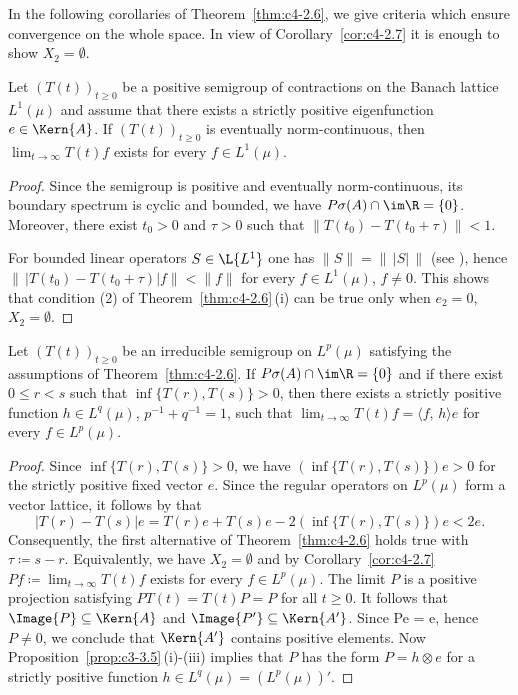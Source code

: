 In the following corollaries of Theorem~\ref{thm:c4-2.6}, we give criteria which ensure convergence on the whole space.
In view of Corollary~\ref{cor:c4-2.7} it is enough to show $X_{2} = \emptyset$.
\begin{corollary}\label{cor:c4-2.9}
%
Let $(T(t))_{t \geq 0}$ be a positive semigroup of contractions on the Banach lattice $L^{1}(\mu)$ and assume that there exists a strictly positive eigenfunction $e \in \Kern{A}$.
If\/ $(T(t))_{t \geq 0}$ is eventually norm-continuous, then $\lim_{t \to \infty}T(t)f$ exists for every $f \in L^{1}(\mu)$.
\end{corollary}
\begin{proof}
Since the semigroup is positive and eventually norm-continuous, its boundary spectrum is cyclic and bounded, \ie  we have $P{\sigma}(A) \cap \im\R = \{0\}$.
Moreover, there exist $t_{0} > 0$ and $\tau > 0$ such that $\|T(t_{0}) - T(t_{0}+\tau)\| < 1$.

For bounded linear operators $S \in \L{L^{1}}$ 
one has $\|S\| = \|\,|S|\,\|$ (see \textcite[IV, Theorem 1.5]{schaefer:1974}), hence $\|\,|T(t_{0}) - T(t_{0}+\tau)| f\| < \|f\|$ for every $f \in L^{1}(\mu)$, $f \neq 0$.
This shows that condition (2) of Theorem~\ref{thm:c4-2.6}\,(i) can be true only when $e_{2} = 0$, \ie  $X_{2} = \emptyset$.
\end{proof}
\begin{corollary}\label{cor:c4-2.10}
%
%
Let $(T(t))_{t\geq 0}$ be an irreducible semigroup on $L^{p}(\mu)$ satisfying the assumptions of Theorem~\ref{thm:c4-2.6}.
If\/ $P{\sigma}(A) \cap \im\R = \{0\}$ and if there exist $0 \leq r < s$ such that $\inf\{T(r),T(s)\} > 0$, then there exists a strictly positive function $h \in L^{q}(\mu)$, $p^{-1}+q^{-1} = 1$, such that $\lim_{t \to \infty} T(t)f = \langle f,\,h \rangle e$ for every $f \in L^{p}(\mu)$.
\end{corollary}
\begin{proof}
Since $\inf\{T(r),T(s)\} > 0$, we have $(\inf\{T(r),T(s)\})e > 0$ for the strictly positive fixed vector $e$.
Since the regular operators on $L^{p}(\mu)$ form a vector lattice, it follows by \textcite[II.1.4, Formula (5) \& (5')]{schaefer:1974} that 
\[
|T(r) - T(s)|e = T(r)e + T(s)e - 2(\inf\{T(r),T(s)\})e < 2e .
\]
Consequently, the first alternative of Theorem~\ref{thm:c4-2.6} holds true with $\tau \coloneq s-r$.
Equivalently, we have $X_{2} = \emptyset$ and by Corollary~\ref{cor:c4-2.7} $Pf \coloneq \lim_{t \to \infty} T(t)f$ exists for every $f \in L^{p}(\mu)$.
The limit $P$ is a positive projection satisfying $PT(t) = T(t)P = P$ for all $t \geq 0$.
It follows that $\Image{P} \subseteq \Kern{A}$ and $\Image{P'} \subseteq \Kern{A'}$.
Since Pe = e, hence $P \neq 0$, we conclude that $\Kern{A'}$ contains positive elements.
Now Proposition~\ref{prop:c3-3.5}\,(i)-(iii) implies that $P$ has the form $P = h \otimes e$ for a strictly positive function $h \in L^{q}(\mu) = (L^{p}(\mu))'$.
\end{proof}
